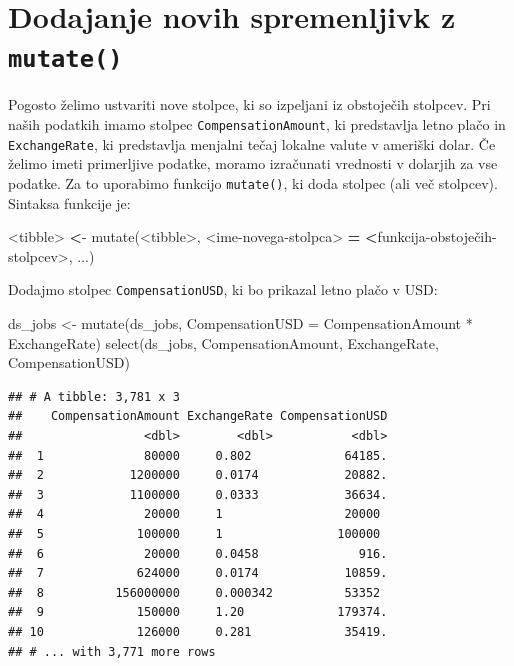 \documentclass[
]{book}
\newenvironment{Shaded}{\begin{snugshade}}{\end{snugshade}}
\newcommand{\AttributeTok}[1]{\textcolor[rgb]{0.77,0.63,0.00}{#1}}
\newcommand{\ErrorTok}[1]{\textcolor[rgb]{0.64,0.00,0.00}{\textbf{#1}}}
\newcommand{\FunctionTok}[1]{\textcolor[rgb]{0.00,0.00,0.00}{#1}}
\newcommand{\NormalTok}[1]{#1}
\newcommand{\OtherTok}[1]{\textcolor[rgb]{0.56,0.35,0.01}{#1}}
\newcommand{\SpecialCharTok}[1]{\textcolor[rgb]{0.00,0.00,0.00}{#1}}
\begin{document}
\hypertarget{dodajanje-novih-spremenljivk-z-mutate}{%
\section{\texorpdfstring{Dodajanje novih spremenljivk z \texttt{mutate()}}{Dodajanje novih spremenljivk z mutate()}}\label{dodajanje-novih-spremenljivk-z-mutate}}

Pogosto želimo ustvariti nove stolpce, ki so izpeljani iz obstoječih stolpcev. Pri naših podatkih imamo stolpec \texttt{CompensationAmount}, ki predstavlja letno plačo in \texttt{ExchangeRate}, ki predstavlja menjalni tečaj lokalne valute v ameriški dolar. Če želimo imeti primerljive podatke, moramo izračunati vrednosti v dolarjih za vse podatke. Za to uporabimo funkcijo \texttt{mutate()}, ki doda stolpec (ali več stolpcev). Sintaksa funkcije je:

\begin{Shaded}
\begin{Highlighting}[]
\SpecialCharTok{\textless{}}\NormalTok{tibble}\SpecialCharTok{\textgreater{}} \ErrorTok{\textless{}}\SpecialCharTok{{-}} \FunctionTok{mutate}\NormalTok{(}\SpecialCharTok{\textless{}}\NormalTok{tibble}\SpecialCharTok{\textgreater{}}\NormalTok{, }\SpecialCharTok{\textless{}}\NormalTok{ime}\SpecialCharTok{{-}}\NormalTok{novega}\SpecialCharTok{{-}}\NormalTok{stolpca}\SpecialCharTok{\textgreater{}} \ErrorTok{=} \ErrorTok{\textless{}}\NormalTok{funkcija}\SpecialCharTok{{-}}\NormalTok{obstoječih}\SpecialCharTok{{-}}\NormalTok{stolpcev}\SpecialCharTok{\textgreater{}}\NormalTok{, ...)}
\end{Highlighting}
\end{Shaded}

Dodajmo stolpec \texttt{CompensationUSD}, ki bo prikazal letno plačo v USD:

\begin{Shaded}
\begin{Highlighting}[]
\NormalTok{ds\_jobs }\OtherTok{\textless{}{-}} \FunctionTok{mutate}\NormalTok{(ds\_jobs, }\AttributeTok{CompensationUSD =}\NormalTok{ CompensationAmount }\SpecialCharTok{*}\NormalTok{ ExchangeRate)}
\FunctionTok{select}\NormalTok{(ds\_jobs, CompensationAmount, ExchangeRate, CompensationUSD)}
\end{Highlighting}
\end{Shaded}

\begin{verbatim}
## # A tibble: 3,781 x 3
##    CompensationAmount ExchangeRate CompensationUSD
##                 <dbl>        <dbl>           <dbl>
##  1              80000     0.802             64185.
##  2            1200000     0.0174            20882.
##  3            1100000     0.0333            36634.
##  4              20000     1                 20000 
##  5             100000     1                100000 
##  6              20000     0.0458              916.
##  7             624000     0.0174            10859.
##  8          156000000     0.000342          53352 
##  9             150000     1.20             179374.
## 10             126000     0.281             35419.
## # ... with 3,771 more rows
\end{verbatim}
\end{document}
